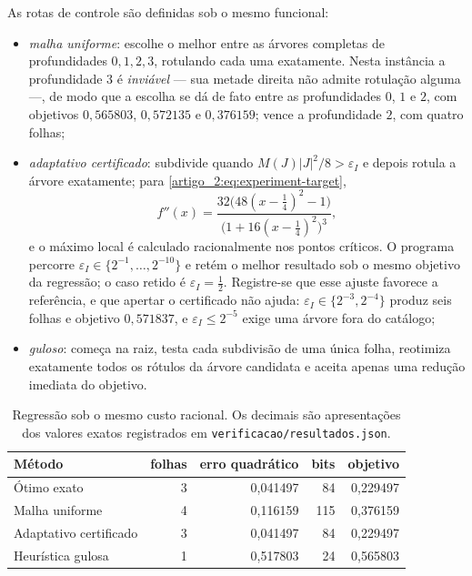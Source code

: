 As rotas de controle são definidas sob o mesmo funcional:
\begin{itemize}[leftmargin=1.7em]
 \item \emph{malha uniforme}: escolhe o melhor entre as árvores completas de
 profundidades $0,1,2,3$, rotulando cada uma exatamente. Nesta instância a
 profundidade $3$ é \emph{inviável} --- sua metade direita não admite
 rotulação alguma ---, de modo que a escolha se dá de fato entre as
 profundidades $0$, $1$ e $2$, com objetivos $0{,}565803$, $0{,}572135$ e
 $0{,}376159$; vence a profundidade $2$, com quatro folhas;
 \item \emph{adaptativo certificado}: subdivide quando
 $M(J)|J|^2/8>\varepsilon_I$ e depois rotula a árvore exatamente; para
 \eqref{artigo_2:eq:experiment-target},
 \[
 f''(x)=
 \frac{32\bigl(48(x-\tfrac14)^2-1\bigr)}
      {\bigl(1+16(x-\tfrac14)^2\bigr)^3},
 \]
 e o máximo local é calculado racionalmente nos pontos críticos. O programa
 percorre $\varepsilon_I\in\{2^{-1},\dots,2^{-10}\}$ e retém o melhor
 resultado sob o mesmo objetivo da regressão; o caso retido é
 $\varepsilon_I=\tfrac12$. Registre-se que esse ajuste favorece a referência,
 e que apertar o certificado não ajuda: $\varepsilon_I\in\{2^{-3},2^{-4}\}$
 produz seis folhas e objetivo $0{,}571837$, e $\varepsilon_I\le2^{-5}$ exige
 uma árvore fora do catálogo;
 \item \emph{guloso}: começa na raiz, testa cada subdivisão de uma única folha,
 reotimiza exatamente todos os rótulos da árvore candidata e aceita apenas
 uma redução imediata do objetivo.
\end{itemize}

\begin{table}[t]
 \centering
 \caption{Regressão sob o mesmo custo racional. Os decimais são
 apresentações dos valores exatos registrados em
 \texttt{verificacao/resultados.json}.}
 \label{artigo_2:tab:selector-comparison}
 \small
 \begin{tabular}{lrrrr}
\toprule
Método & folhas & erro quadrático & bits & objetivo \\
\midrule
Ótimo exato & 3 & 0{,}041497 & 84 & 0{,}229497 \\
Malha uniforme & 4 & 0{,}116159 & 115 & 0{,}376159 \\
Adaptativo certificado & 3 & 0{,}041497 & 84 & 0{,}229497 \\
Heurística gulosa & 1 & 0{,}517803 & 24 & 0{,}565803 \\
\bottomrule
\end{tabular}

\end{table}

